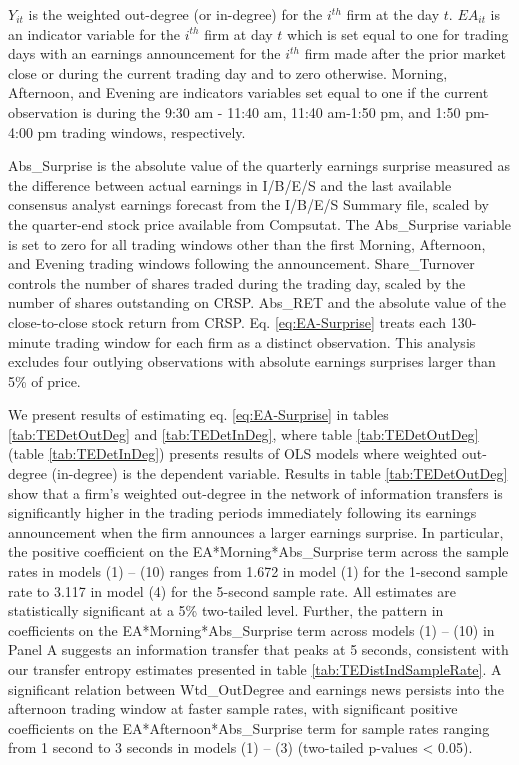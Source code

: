 \noindent \(Y_{it}\) is the weighted out-degree (or in-degree) for the \(i^{th}\) firm at the day \(t\).  \(EA_{it}\) is an indicator variable for the \(i^{th}\) firm at day \(t\)  which is set equal to one for trading days with an earnings announcement for the \(i^{th}\) firm made after the prior market close or during the current trading day and to zero otherwise.   Morning, Afternoon,  and Evening are indicators variables set equal to one if the current observation is during the 9:30 am - 11:40 am, 11:40 am-1:50 pm,  and 1:50 pm-4:00 pm trading windows, respectively.   

Abs\_Surprise is the absolute value of the quarterly earnings surprise measured as the difference between actual earnings in I/B/E/S and the last available consensus analyst earnings forecast from the I/B/E/S Summary file,  scaled by the quarter-end stock price available from Compsutat.  The Abs\_Surprise variable is set to zero for all trading windows other than the first Morning, Afternoon, and Evening trading windows following the announcement.   Share\_Turnover controls the number of shares traded during the trading day, scaled by the number of shares outstanding on CRSP.  Abs\_RET and the absolute value of the close-to-close stock return from CRSP.  Eq. \ref{eq:EA-Surprise} treats each 130-minute trading window for each firm as a distinct observation.  This analysis excludes four outlying observations with absolute earnings surprises larger than 5\% of price.  

We present results of estimating eq. \ref{eq:EA-Surprise} in tables \ref{tab:TEDetOutDeg} and \ref{tab:TEDetInDeg},  where table \ref{tab:TEDetOutDeg} (table \ref{tab:TEDetInDeg}) presents results of OLS models where weighted out-degree (in-degree) is the dependent variable.   Results in table \ref{tab:TEDetOutDeg} show that a firm’s weighted out-degree in the network of information transfers is significantly higher in the trading periods immediately following its earnings announcement when the firm announces a larger earnings surprise. In particular, the positive coefficient on the EA*Morning*Abs\_Surprise term across the sample rates in models (1) – (10) ranges from 1.672 in model (1) for the 1-second sample rate to 3.117 in model (4) for the 5-second sample rate. All estimates are statistically significant at a 5\% two-tailed level.  Further, the pattern in coefficients on the EA*Morning*Abs\_Surprise term across models (1) – (10) in Panel A suggests an information transfer that peaks at 5 seconds, consistent with our transfer entropy estimates presented in table \ref{tab:TEDistIndSampleRate}.  A significant relation between Wtd\_OutDegree and earnings news persists into the afternoon trading window at faster sample rates, with significant positive coefficients on the EA*Afternoon*Abs\_Surprise term for sample rates ranging from 1 second to 3 seconds in models (1) – (3) (two-tailed p-values < 0.05). 

